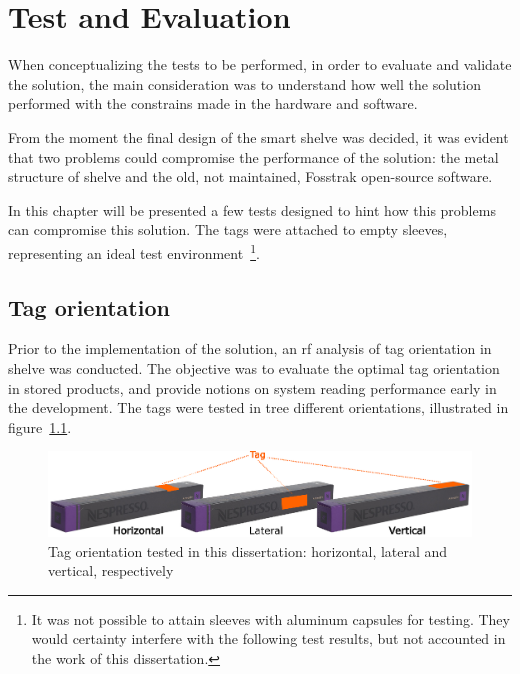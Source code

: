 \chapter{Test and Evaluation} \label{sec:tests}

When conceptualizing the tests to be performed, in order to evaluate and validate the solution, the main consideration was to understand how well the solution performed with the constrains made in the hardware and software.

From the moment the final design of the smart shelve was decided, it was evident that two problems could compromise the performance of the solution: the metal structure of shelve and the old, not maintained, Fosstrak open-source software.

In this chapter will be presented a few tests designed to hint how this problems can compromise this solution. The tags were attached to empty sleeves, representing an ideal test environment~\footnote{It was not possible to attain sleeves with aluminum capsules for testing. They would certainty interfere with the following test results, but not accounted in the work of this dissertation.}.


\section{Tag orientation} \label{sec:test1}

Prior to the implementation of the solution, an \ac{rf} analysis of tag orientation in shelve was conducted.
The objective was to evaluate the optimal tag orientation in stored products, and provide notions on system reading performance early in the development.
The tags were tested in tree different orientations, illustrated in figure~\ref{fig:tagorientations}.

\begin{figure}
    \centering
    \includegraphics[width=\textwidth]{figs/tests/tag_positions.eps}
    \caption{Tag orientation tested in this dissertation: horizontal, lateral and vertical, respectively}
    \label{fig:tagorientations}
\end{figure}



